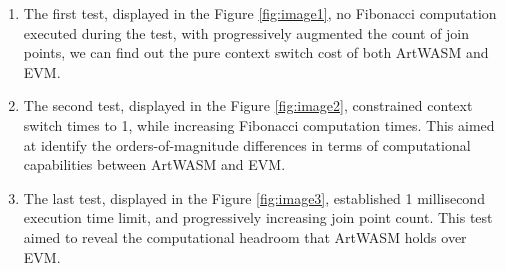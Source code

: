 \begin{enumerate}
  \item The first test, displayed in the Figure \ref{fig:image1}, no Fibonacci computation executed during the test, with progressively augmented the count of join points, we can find out the pure context switch cost of both ArtWASM and EVM.
  \item The second test, displayed in the Figure \ref{fig:image2}, constrained context switch times to 1, while increasing Fibonacci computation times. This aimed at identify the orders-of-magnitude differences in terms of computational capabilities between ArtWASM and EVM.
  \item The last test, displayed in the Figure \ref{fig:image3}, established 1 millisecond execution time limit, and progressively increasing join point count. This test aimed to reveal the computational headroom that ArtWASM holds over EVM.
\end{enumerate}

